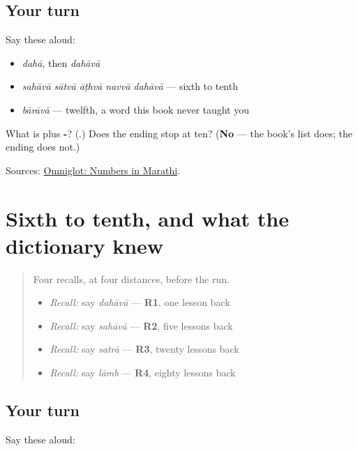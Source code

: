 \subsection*{Your turn}
Say these aloud:

\begin{itemize}
\raggedright
  \item \emph{dahā}, then \emph{dahāvā}
  \item \emph{sahāvā sātvā āṭhvā navvā dahāvā} — sixth to tenth
  \item \emph{bārāvā} — twelfth, a word this book never taught you
\end{itemize}

\begin{tcolorbox}[breakable,colback=teal!4,colframe=teal!35!black,title={Before you move on}]
What is \textbf{} plus \textbf{-}? (\textbf{}.) Does the ending stop at ten? (\textbf{No} — the book's list does; the ending does not.)

Sources: \href{https://www.omniglot.com/language/numbers/marathi.htm}{Omniglot: Numbers in Marathi}.
\end{tcolorbox}
\section[\texorpdfstring{\mr{सहावा} · \mr{सातवा} … (sahāvā · sātvā …)}{सहावा · सातवा … (sahāvā · sātvā …)}]{Sixth to tenth, and what the dictionary knew}

\label{lesson:MR-R61-sixth-to-tenth}



\begin{quote}
Four recalls, at four distances, before the run.

\begin{itemize}
\raggedright
  \item \emph{Recall:} say \emph{dahāvā} — \textbf{R1}, one lesson back
  \item \emph{Recall:} say \emph{sahāvā} — \textbf{R2}, five lessons back
  \item \emph{Recall:} say \emph{satrā} — \textbf{R3}, twenty lessons back
  \item \emph{Recall:} say \emph{lāmb} — \textbf{R4}, eighty lessons back
\end{itemize}
\end{quote}

\subsection*{Your turn}
Say these aloud:

